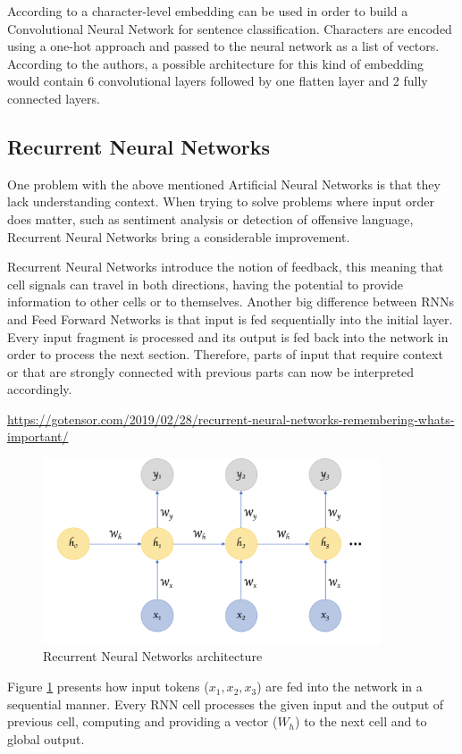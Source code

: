 \documentclass[12pt,a4paper]{report}
\begin{document}
According to \citet{NIPS2015_250cf8b5} a character-level embedding can be used in order to build a Convolutional Neural Network for sentence classification. 
Characters are encoded using a one-hot approach and passed to the neural network as a list of vectors. According to the authors, a possible architecture for this kind of embedding would contain 6 convolutional layers followed by one flatten layer and 2 fully connected layers.


\subsection{Recurrent Neural Networks}
One problem with the above mentioned Artificial Neural Networks is that they lack understanding context. When trying to solve problems where input order does matter, such as sentiment analysis or detection of offensive language, Recurrent Neural Networks bring a considerable improvement.

Recurrent Neural Networks introduce the notion of feedback, this meaning that cell signals can travel in both directions, having the potential to provide information to other cells or to themselves. Another big difference between RNNs and Feed Forward Networks is that input is fed sequentially into the initial layer. Every input fragment is processed and its output is fed back into the network in order to process the next section. Therefore, parts of input that require context or that are strongly connected with previous parts can now be interpreted accordingly.

\urldef{\urlRNN}\url{https://gotensor.com/2019/02/28/recurrent-neural-networks-remembering-whats-important/}
\begin{figure}[H]
\centering
\includegraphics[width=10cm]{pics/rnn.png}
  \caption[Recurrent Neural Networks architecture]{Recurrent Neural Networks architecture\footnotemark}
  \label{fig:RNN}
\end{figure}
\footnotetext{\urlRNN}
Figure \ref{fig:RNN} presents how input tokens ($x_1, x_2, x_3$) are fed into the network in a sequential manner. Every RNN cell processes the given input and the output of previous cell, computing and providing a vector ($W_h$) to the next cell and to global output.
\end{document}
